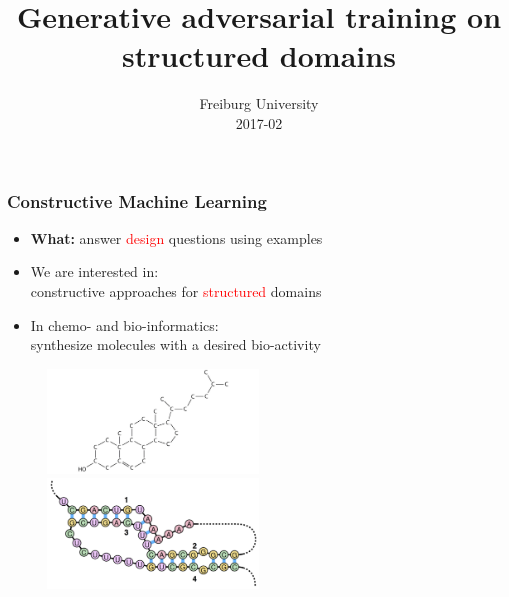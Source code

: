 \documentclass{beamer}
\title 
{Generative adversarial training on \\ structured domains}
\author %
{\underline{Stefan Mautner} \and Fabrizio Costa 
    \small{ 
        \texttt{
            \href{mailto:mautner@informatik.uni-freiburg.de}
            {mautner@informatik.uni-freiburg.de}
        }
        \texttt{
            \href{mailto:f.costa@exeter.ac.uk}
            {f.costa@exeter.ac.uk}
        }
   }
}
\date 
{Freiburg University \\2017-02}
\newcommand{\red}[1]{\textcolor{red}{#1}}
\begin{document}
\frame{\titlepage}



\begin{frame}
\frametitle{Constructive Machine Learning}

    \begin{itemize}
        \item {\bf What:} answer \red{design} questions using examples
        \item We are interested in: \\
        constructive approaches for \red{structured} domains
        \item In chemo- and bio-informatics: \\
        synthesize molecules with a desired bio-activity
    \end{itemize}
    \begin{figure}
        \centering
        \includegraphics[width=0.5\textwidth]{images/mol.jpg}
        \includegraphics[width=0.5\textwidth]{images/rna.png}
    \end{figure}    
\end{frame}




\end{document}
